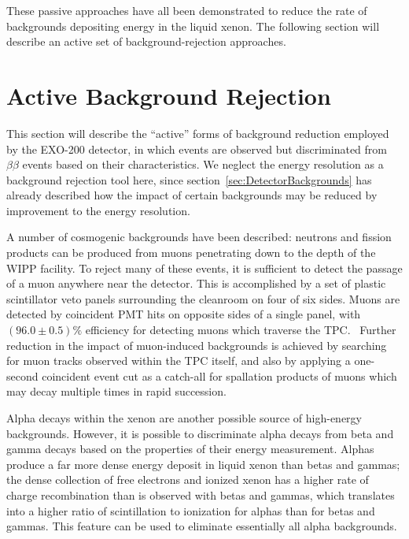These passive approaches have all been demonstrated to reduce the rate of backgrounds depositing energy in the liquid xenon.  The following section will describe an active set of background-rejection approaches.

\section{Active Background Rejection}\label{sec:DetectorActiveBackgroundRejection}

This section will describe the ``active'' forms of background reduction employed by the EXO-200 detector, in which events are observed but discriminated from $\beta\beta$ events based on their characteristics.  We neglect the energy resolution as a background rejection tool here, since section~\ref{sec:DetectorBackgrounds} has already described how the impact of certain backgrounds may be reduced by improvement to the energy resolution.

A number of cosmogenic backgrounds have been described: neutrons and fission products can be produced from muons penetrating down to the depth of the WIPP facility.  To reject many of these events, it is sufficient to detect the passage of a muon anywhere near the detector.  This is accomplished by a set of plastic scintillator veto panels surrounding the cleanroom on four of six sides.  Muons are detected by coincident PMT hits on opposite sides of a single panel, with $(96.0 \pm 0.5)\%$ efficiency for detecting muons which traverse the TPC.~\cite{detectorPartI}  Further reduction in the impact of muon-induced backgrounds is achieved by searching for muon tracks observed within the TPC itself, and also by applying a one-second coincident event cut as a catch-all for spallation products of muons which may decay multiple times in rapid succession.

Alpha decays within the xenon are another possible source of high-energy backgrounds.  However, it is possible to discriminate alpha decays from beta and gamma decays based on the properties of their energy measurement.  Alphas produce a far more dense energy deposit in liquid xenon than betas and gammas; the dense collection of free electrons and ionized xenon has a higher rate of charge recombination than is observed with betas and gammas, which translates into a higher ratio of scintillation to ionization for alphas than for betas and gammas.  This feature can be used to eliminate essentially all alpha backgrounds.

